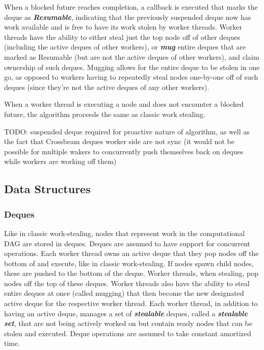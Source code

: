 \documentclass[bsc,frontabs,singlespacing,parskip,deptreport,normalheadings]{infthesis}
\begin{document}
When a blocked future reaches completion, a callback is executed that marks the
deque as \textbf{\textit{Resumable}}, indicating that the previously suspended
deque now has work available and is free to have its work stolen by worker
threads. Worker threads have the ability to either steal just the top node off
of other deques (including the active deques of other workers), or
\textit{\textbf{mug}} entire deques that are marked as Resumable (but are not
the active deques of other workers), and claim ownership of such deques. Mugging
allows for the entire deque to be stolen in one go, as opposed to workers having
to repeatedly steal nodes one-by-one off of such deques (since they're not the
active deques of any other workers). 

When a worker thread is executing a node and does not encounter a blocked
future, the algorithm proceeds the same as classic work stealing.

TODO: suspended deque required for proactive nature of algorithm, as well as
the fact that Crossbeam deques worker side are not sync (it would not be
possible for multiple wakers to concurrently push themselves back on deques
while workers are working off them)

\subsection{Data Structures}

\subsubsection*{Deques}

Like in classic work-stealing, nodes that represent work in the computational
DAG are stored in deques. Deques are assumed to have support for concurrent
operations. Each worker thread owns an active deque that they pop nodes off the
bottom of and execute, like in classic work-stealing. If nodes spawn child
nodes, these are pushed to the bottom of the deque. Worker threads, when
stealing, pop nodes off the top of these deques. Worker threads also have the
ability to steal entire deques at once (called mugging) that then become the new
designated active deque for the respective worker thread. Each worker thread, in
addition to having an active deque, manages a set of \textbf{\textit{stealable}}
deques, called a \textbf{\textit{stealable set}}, that are not being actively
worked on but contain ready nodes that can be stolen and executed. Deque
operations are assumed to take constant amortized time.
\end{document}
